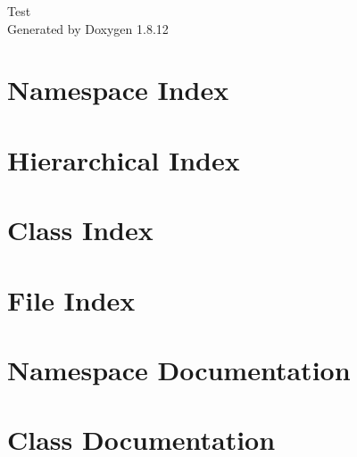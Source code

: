 \documentclass[twoside]{book}
\newcommand{\+}{\discretionary{\mbox{\scriptsize$\hookleftarrow$}}{}{}}
\newcommand{\clearemptydoublepage}{%
  \newpage{\pagestyle{empty}\cleardoublepage}%
}
\begin{document}
\hypersetup{pageanchor=false,
             bookmarksnumbered=true,
             pdfencoding=unicode
            }
\begin{titlepage}
\vspace*{7cm}
\begin{center}%
{\Large Test }\\
\vspace*{1cm}
{\large Generated by Doxygen 1.8.12}\\
\end{center}
\end{titlepage}
\clearemptydoublepage
{}
\tableofcontents
\clearemptydoublepage
{}
\hypersetup{pageanchor=true}

\chapter{Namespace Index}

\chapter{Hierarchical Index}

\chapter{Class Index}

\chapter{File Index}

\chapter{Namespace Documentation}

\chapter{Class Documentation}















\end{document}
